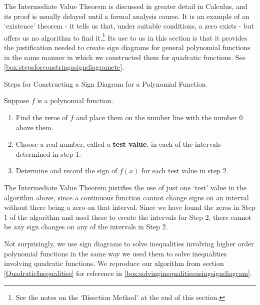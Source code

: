 The Intermediate Value Theorem is discussed in greater detail in Calculus, and its proof is usually delayed until a formal analysis course.  It is an example of an `existence' theorem - it tells us that, under suitable conditions, a zero exists - but offers us no algorithm to find it.\footnote{See the notes on the `Bisection Method' at the end of this section.} Its use to us in this section is that it provides the justification needed to create sign diagrams for general polynomial functions in the same manner in which we constructed them for quadratic functions. See \autoref{box:stepsforconstringasigndiagrametc}.

\begin{floatbox}[label=box:stepsforconstringasigndiagrametc]{Steps for Constructing a Sign Diagram for a Polynomial Function}

Suppose $f$ is a polynomial function. 

\begin{enumerate}

\item  Find the zeros of $f$ and place them on the number line with the number $0$ above them.

\item  Choose a real number, called a \textbf{test value}, in each of the intervals determined in step 1. 

\item  Determine and record the sign of $f(x)$ for each test value in step 2.

\end{enumerate}

\end{floatbox}

The Intermediate Value Theorem justifies the use of just one `test' value in the algorithm above, since a continuous function cannot change signs on an interval without there being a zero on that interval.  Since we have found the zeros in Step 1 of the algorithm and used these to create the intervals for Step 2, there cannot be any sign changes on any of the intervals in Step 2.

Not surprisingly, we use sign diagrams to solve inequalities involving higher order polynomial functions in the same way we used them to solve inequalities involving quadratic functions. We reproduce our algorithm from section \ref{QuadraticInequalities} for reference in \autoref{box:solvinginequalitiesusingsigndiagram}.

